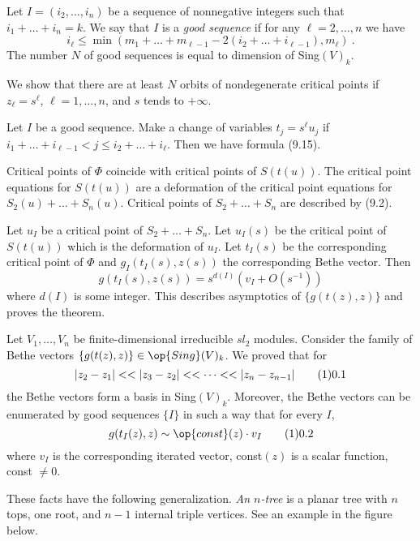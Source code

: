 \bigskip
Let $I=(i_2,\dots ,i_n)$ be a sequence of nonnegative integers such
that $i_1+\dots +i_n =k$. We say that $I$ is a
{\it good sequence} if for
any $\ell =2,\dots ,n$ we have
$$
i_{\ell} \leq \min(m_1+\dots +m_{\ell -1}-2(i_2+\dots +i_{\ell
-1}),m_\ell) \ .
$$
The number $N$ of good sequences is equal to  dimension of
Sing$(V)_k$.

We show that there are at least $N$ orbits of nondegenerate critical
points if $z_\ell =s^\ell$, $\ell =1,\dots ,n$, and $s$ tends to
$+\infty$.

 Let $I$ be a good sequence. Make a change of variables
$t_j =s^\ell u_j$ if $i_1+\dots +i_{\ell -1} < j \leq i_2+\dots +i_\ell$.
Then we have formula (9.15).

 Critical points of $\Phi$ coincide with
critical points of $S(t(u))$. The critical point equations for $S(t(u))$
are a deformation of the critical point equations for $S_2(u)+\dots
+S_n(u)$. Critical points of $S_2+\dots +S_n$ are described by (9.2).

Let $u_I$ be a critical point of $S_2+\dots +S_n$. Let $u_I(s)$ be the
critical point of $S(t(u))$ which is the deformation of $u_I$. Let
$t_I(s)$ be the corresponding critical point of $\Phi$ and
$g_I(t_I(s), z(s))$ the corresponding Bethe vector. Then
$$
g(t_I(s),z(s)) = s^{d(I)} (v_I +O(s^{-1}))
$$
where $d(I)$ is some integer. This describes asymptotics of
$\{ g(t(z),z)\}$ and proves the theorem.

\bigskip\bigskip
{}

Let $V_1,\dots ,V_n$ be finite-dimensional irreducible $sl_2$ modules.
Consider the family of Bethe vectors $\{ g(t(z),z)\}\in
{\op{Sing}}(V)_k$. We proved that for
$$
|z_2-z_1| << |z_3-z_2| << \dots << |z_n-z_{n-1}|   \tag 10.1
$$
the Bethe vectors form a basis in Sing$(V)_k$. Moreover, the Bethe
vectors can be enumerated by good sequences $\{ I\}$ in such a way
that for every $I$,
$$
g(t_I(z),z) \sim {\op{const}}(z) \cdot v_I    \tag 10.2
$$
where $v_I$ is the corresponding iterated vector, const$(z)$ is a
scalar function, const $\neq 0$.

These facts have the following generalization. {\it An $n$-tree} is a
planar tree with $n$ tops, one root, and $n-1$ internal triple
vertices.  See an example in the figure below.
\newline \
\newline \
\newline \
\newline \
\newline \
\newline \

